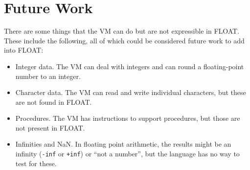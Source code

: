 \documentclass[11pt]{article}
\begin{document}
\section{Future Work}

There are some things that the VM can do but are not expressible in
FLOAT. These include the following, all of which could be considered
future work to add into FLOAT:
\begin{itemize}
\item
  Integer data. The VM can deal with integers and can round a
  floating-point number to an integer.

\item
  Character data. The VM can read and write individual characters,
  but these are not found in FLOAT.

\item
  Procedures. The VM has instructions to support procedures, but those
  are not present in FLOAT.

\item
  Infinities and NaN. In floating point arithmetic, the results might
  be an infinity (\texttt{-inf} or \texttt{+inf}) or ``not a number'',
  but the language has no way to test for these.
\end{itemize}
\end{document}
